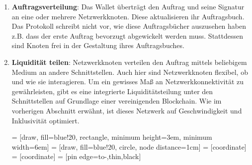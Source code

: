 \documentclass[UTF8,nofonts]{article}
\makeatletter
\newenvironment{figurehere}
 {\def\@captype{figure}}
 {}
\makeatother
\begin{document}
\begin{multicols}{2}
\begin{enumerate}
\item \textbf{Auftragsverteilung}: Das Wallet überträgt den Auftrag und seine Signatur an eine oder mehrere Netzwerkknoten. Diese aktualisieren ihr Auftragsbuch. Das Protokoll schreibt nicht vor, wie diese Auftragsbücher auszusehen haben z.B. dass der erste Auftrag bevorzugt abgewickelt werden muss. Stattdessen sind Knoten frei in der Gestaltung ihres Auftragsbuches.

\item \textbf{Liquidität teilen}: Netzwerkknoten verteilen den Auftrag mittels beliebigem Medium an andere Schnittstellen. Auch hier sind Netzwerkknoten flexibel, ob und wie sie interagieren. Um ein gewisses Maß an Netzwerkkonnektivität zu gewährleisten, gibt es eine integrierte Liquiditätsteilung unter den Schnittstellen auf Grundlage einer vereinigenden Blockchain. Wie im vorherigen Abschnitt erwähnt, ist dieses Netzwerk auf Geschwindigkeit und Inklusivität optimiert.

\begin{center}
\begin{figurehere}
\centering
{} = [draw, fill=blue!20, rectangle, 
    minimum height=3em, minimum width=6em]
 = [draw, fill=blue!20, circle, node distance=1cm]
 = [coordinate]
 = [coordinate]
 = [pin edge={to-,thin,black}]

\end{figurehere}
\end{center}
\end{enumerate}
\end{multicols}
\end{document}
